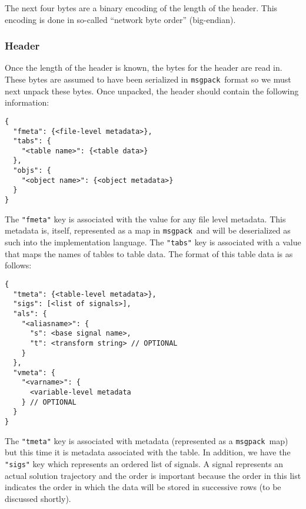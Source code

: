 \documentclass[11pt,a4paper,twocolumn]{article}
\newcommand{\msgpack}{\texttt{msgpack}}
\newcommand{\code}[1]{\texttt{#1}} %
\begin{document}
The next four bytes are a binary encoding of the length of the header.
This encoding is done in so-called ``network byte order''
(big-endian).

\subsubsection{Header}

Once the length of the header is known, the bytes for the header are
read in.  These bytes are assumed to have been serialized in
\msgpack\ format so we must next unpack these bytes.  Once unpacked,
the header should contain the following information:

\begin{verbatim}
{
  "fmeta": {<file-level metadata>},
  "tabs": {
    "<table name>": {<table data>}
  },
  "objs": {
    "<object name>": {<object metadata>}
  }
}
\end{verbatim}

The \code{"fmeta"} key is associated with the value for any file level
metadata.  This metadata is, itself, represented as a map in
\msgpack\ and will be deserialized as such into the implementation
language.  The \code{"tabs"} key is associated with a value that maps
the names of tables to table data.  The format of this table data is
as follows:

\begin{verbatim}
{
  "tmeta": {<table-level metadata>},
  "sigs": [<list of signals>],
  "als": {
    "<aliasname>": {
      "s": <base signal name>,
      "t": <transform string> // OPTIONAL
    }
  },
  "vmeta": {
    "<varname>": {
      <variable-level metadata
    } // OPTIONAL
  }
}
\end{verbatim}

The \code{"tmeta"} key is associated with metadata (represented as a
\msgpack\ map) but this time it is metadata associated with the table.
In addition, we have the \code{"sigs"} key which represents an ordered
list of signals.  A signal represents an actual solution trajectory
and the order is important because the order in this list indicates
the order in which the data will be stored in successive rows (to be
discussed shortly).
\end{document}
